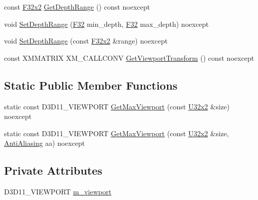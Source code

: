 \begin{DoxyCompactItemize}
\item 
const \hyperlink{namespacemage_aa87237ad091f5cd7da612b8523fc108f}{F32x2} \hyperlink{classmage_1_1rendering_1_1_viewport_a50cb4c020709eddb8addb4420a59e1d0}{Get\+Depth\+Range} () const noexcept
\item 
void \hyperlink{classmage_1_1rendering_1_1_viewport_a2dc258c833d225567bba28129c061c2d}{Set\+Depth\+Range} (\hyperlink{namespacemage_aa97e833b45f06d60a0a9c4fc22ae02c0}{F32} min\+\_\+depth, \hyperlink{namespacemage_aa97e833b45f06d60a0a9c4fc22ae02c0}{F32} max\+\_\+depth) noexcept
\item 
void \hyperlink{classmage_1_1rendering_1_1_viewport_a99c76e086ab0db6e9311ab4985d760d6}{Set\+Depth\+Range} (const \hyperlink{namespacemage_aa87237ad091f5cd7da612b8523fc108f}{F32x2} \&range) noexcept
\item 
const X\+M\+M\+A\+T\+R\+IX X\+M\+\_\+\+C\+A\+L\+L\+C\+O\+NV \hyperlink{classmage_1_1rendering_1_1_viewport_ac4ea113f2c019b5b1d369898537ab5c3}{Get\+Viewport\+Transform} () const noexcept
\end{DoxyCompactItemize}
\subsection*{Static Public Member Functions}
\begin{DoxyCompactItemize}
\item 
static const D3\+D11\+\_\+\+V\+I\+E\+W\+P\+O\+RT \hyperlink{classmage_1_1rendering_1_1_viewport_a9a931b51974ac4cd2d93aac2c0e10a09}{Get\+Max\+Viewport} (const \hyperlink{namespacemage_a88e05bff0300120c013285d3dcad95c5}{U32x2} \&size) noexcept
\item 
static const D3\+D11\+\_\+\+V\+I\+E\+W\+P\+O\+RT \hyperlink{classmage_1_1rendering_1_1_viewport_ac971d4f062cf37e3a5a2a57640a13da4}{Get\+Max\+Viewport} (const \hyperlink{namespacemage_a88e05bff0300120c013285d3dcad95c5}{U32x2} \&size, \hyperlink{namespacemage_1_1rendering_ac3f75e49e92b42f2f5fb55c450d8899c}{Anti\+Aliasing} aa) noexcept
\end{DoxyCompactItemize}
\subsection*{Private Attributes}
\begin{DoxyCompactItemize}
\item 
D3\+D11\+\_\+\+V\+I\+E\+W\+P\+O\+RT \hyperlink{classmage_1_1rendering_1_1_viewport_ab0b20f21a771248d9e9659f1029a497d}{m\+\_\+viewport}
\end{DoxyCompactItemize}


